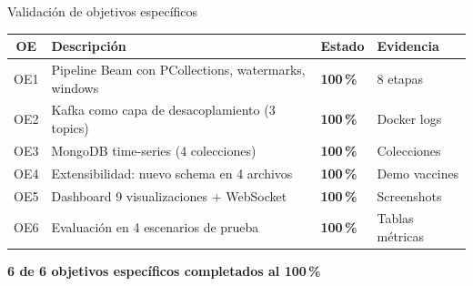 \documentclass[aspectratio=169, 10pt]{beamer}
\begin{document}
\begin{frame}{Validaci\'on de objetivos espec\'ificos}
  \begin{center}
  \renewcommand{\arraystretch}{1.4}
  \begin{tabular}{>{\small}c
                  >{\small}p{6.0cm}
                  >{\centering\arraybackslash\small}p{1.8cm}
                  >{\centering\arraybackslash\small}p{1.8cm}}
    \toprule
    \textbf{OE} & \textbf{Descripci\'on} & \textbf{Estado} & \textbf{Evidencia} \\
    \midrule
    OE1 & Pipeline Beam con PCollections, watermarks, windows
        & \textcolor{successgreen}{\bfseries 100\,\%}
        & 8 etapas \\
    OE2 & Kafka como capa de desacoplamiento (3 topics)
        & \textcolor{successgreen}{\bfseries 100\,\%}
        & Docker logs \\
    OE3 & MongoDB time-series (4 colecciones)
        & \textcolor{successgreen}{\bfseries 100\,\%}
        & Colecciones \\
    OE4 & Extensibilidad: nuevo schema en 4 archivos
        & \textcolor{successgreen}{\bfseries 100\,\%}
        & Demo vaccines \\
    OE5 & Dashboard 9 visualizaciones + WebSocket
        & \textcolor{successgreen}{\bfseries 100\,\%}
        & Screenshots \\
    OE6 & Evaluaci\'on en 4 escenarios de prueba
        & \textcolor{successgreen}{\bfseries 100\,\%}
        & Tablas m\'etricas \\
    \bottomrule
  \end{tabular}
  \end{center}
  \vspace{4pt}
  \begin{alertblock}{}
    \centering\bfseries
    6 de 6 objetivos espec\'ificos completados al 100\,\%
  \end{alertblock}
\end{frame}
\end{document}
